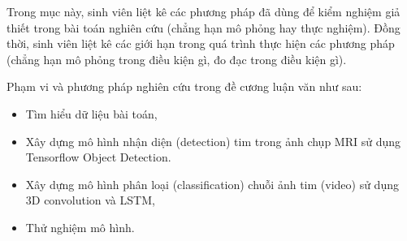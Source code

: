 	Trong mục này, sinh viên liệt kê các phương pháp đã dùng để kiểm nghiệm giả thiết trong bài toán nghiên cứu (chẳng hạn mô phỏng hay thực nghiệm). 
	Đồng thời, sinh viên liệt kê các giới hạn trong quá trình thực hiện các phương pháp (chẳng hạn mô phỏng trong điều kiện gì, đo đạc trong điều kiện gì).
	
		Phạm vi và phương pháp nghiên cứu trong đề cương luận văn như sau:
\begin{itemize} %
			\item Tìm hiểu dữ liệu bài toán,
			\item Xây dựng mô hình nhận diện (detection) tim trong ảnh chụp MRI sử dụng Tensorflow Object Detection.
			\item Xây dựng mô hình phân loại (classification) chuỗi ảnh tim (video) sử dụng 3D convolution và LSTM,
			\item Thử nghiệm mô hình.
	\end{itemize}
	

